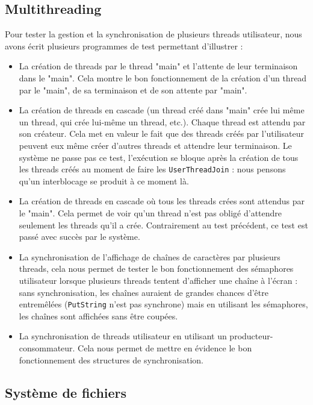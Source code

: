 \documentclass{report}
\begin{document}
\subsection*{Multithreading}
\noindent
Pour tester la gestion et la synchronisation de plusieurs threads utilisateur, nous avons écrit plusieurs programmes de test permettant d'illustrer : 
\begin{itemize}
 \item La création de threads par le thread "main" et l'attente de leur terminaison dans le "main". Cela montre le bon fonctionnement de la création d'un thread par le "main", de sa terminaison et de son attente par "main".
 \item  La création de threads en cascade (un thread créé dans "main" crée lui même un thread, qui crée lui-même un thread, etc.).  Chaque thread est attendu par son créateur. Cela met en valeur le fait que des threads créés par l'utilisateur peuvent eux même créer d'autres threads et attendre leur terminaison. Le système ne passe pas ce test, l’exécution se bloque après la création de tous les threads créés au moment de faire les \texttt{UserThreadJoin} : nous pensons qu'un interblocage se produit à ce moment là. 
 \item La création de threads en cascade où tous les threads crées sont attendus par le "main". Cela permet de voir qu'un thread n'est pas obligé d'attendre seulement les threads qu'il a crée. Contrairement au test précédent, ce test est passé avec succès par le système.

\item La synchronisation de l'affichage de chaînes de caractères par plusieurs threads, cela nous permet de tester le bon fonctionnement des sémaphores utilisateur lorsque plusieurs threads tentent d'afficher une chaîne à l'écran : sans synchronisation, les chaînes auraient de grandes chances d'être entremêlées (\texttt{PutString} n'est pas synchrone) mais en utilisant les sémaphores, les chaînes sont affichées sans être coupées.

\item La synchronisation de threads utilisateur en utilisant un producteur-consommateur. Cela nous permet de mettre en évidence le bon fonctionnement des structures de synchronisation.
\end{itemize}
\subsection*{Système de fichiers}
\end{document}
